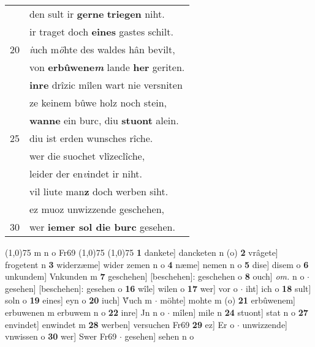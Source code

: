 \documentclass[8pt,a4paper,notitlepage]{article}
\begin{document}
\begin{table}[ht]
\begin{minipage}[t]{0.5\linewidth}
\begin{tabular}{rl}
 & den sult ir \textbf{gerne} \textbf{triegen} niht.\\ 
 & ir traget doch \textbf{eines} gastes schilt.\\ 
20 & \textit{i}uch m\textit{ö}hte des waldes hân bevilt,\\ 
 & von \textbf{erbûwene\textit{m}} lande \textbf{her} geriten.\\ 
 & \textbf{inre} drîzic mîlen wart nie versniten\\ 
 & ze keinem bûwe holz noch stein,\\ 
 & \textbf{wanne} ein burc, diu \textbf{stuont} alein.\\ 
25 & diu ist erden wunsches rîche.\\ 
 & wer die suochet vlîzeclîche,\\ 
 & leider der en\textit{v}indet ir niht.\\ 
 & vil liute man\textbf{z} doch werben siht.\\ 
 & ez muoz unwizzende geschehen,\\ 
30 & wer \textbf{iemer sol die burc} gesehen.\\ 
\end{tabular}
\scriptsize
\line(1,0){75} \newline
m n o Fr69 \newline
\line(1,0){75} \newline
\newline
\line(1,0){75} \newline
\textbf{1} dankete] dancketen n (o) \textbf{2} vrâgete] frogetent n \textbf{3} widerzæme] wider zemen n o \textbf{4} næme] nemen n o \textbf{5} dise] disem o \textbf{6} unkundem] Vnkunden m \textbf{7} geschehen] [beschehen]: geschehen o \textbf{8} ouch] \textit{om.} n o  $\cdot$ gesehen] [beschehen]: gesehen o \textbf{16} wîle] wilen o \textbf{17} wer] vor o  $\cdot$ iht] ich o \textbf{18} sult] soln o \textbf{19} eines] eyn o \textbf{20} iuch] V̂uch m  $\cdot$ möhte] mohte m (o) \textbf{21} erbûwenem] erbuwenen m erbuwem n o \textbf{22} inre] Jn n o  $\cdot$ mîlen] mile n \textbf{24} stuont] stat n o \textbf{27} envindet] enwindet m \textbf{28} werben] versuchen Fr69 \textbf{29} ez] Er o  $\cdot$ unwizzende] vnwissen o \textbf{30} wer] Swer Fr69  $\cdot$ gesehen] sehen n o \newline
\end{minipage}
\end{table}
\newpage
\end{document}
